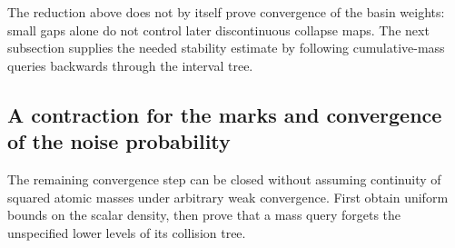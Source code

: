 \documentclass[11pt,letterpaper]{article}
\begin{document}
The reduction above does not by itself prove convergence of the basin
weights: small gaps alone do not control later discontinuous collapse
maps. The next subsection supplies the needed stability estimate by
following cumulative-mass queries backwards through the interval tree.

\subsection{A contraction for the marks and convergence of the noise probability}
\label{sec:marked-limit}

The remaining convergence step can be closed without assuming continuity
of squared atomic masses under arbitrary weak convergence. First obtain
uniform bounds on the scalar density, then prove that a mass query forgets
the unspecified lower levels of its collision tree.
\end{document}

